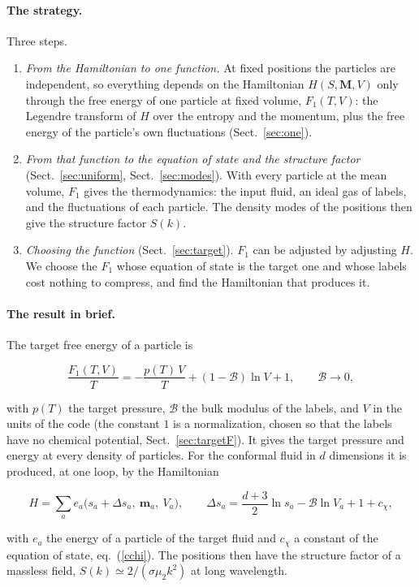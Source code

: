 \documentclass[11pt,aps,preprint,nofootinbib,superscriptaddress,tightenlines]{revtex4-2}
\newcommand{\klab}{\mathcal B}
\def\st{\begin{equation}}
\def\stp{\end{equation}}
\def\Eq#1{eq.~(\ref{#1})}
\def\Sect#1{Sect.~\ref{#1}}
\let\oldparagraph\paragraph
\renewcommand{\paragraph}{\par\bigskip\oldparagraph}
\begin{document}
\paragraph{The strategy.}  Three steps.
\begin{enumerate}
\item \emph{From the Hamiltonian to one function.}  At fixed positions the particles are independent, so everything depends on the Hamiltonian $H(S,\bm M,V)$
  only through the free energy of one particle at fixed volume, $F_1(T,V)$: the Legendre transform of $H$ over the entropy and the momentum, plus the
  free energy of the particle's own fluctuations (\Sect{sec:one}).
\item \emph{From that function to the equation of state and the structure factor} (\Sect{sec:uniform}, \Sect{sec:modes}).  With every particle at the mean volume,
  $F_1$ gives the thermodynamics: the input fluid, an ideal gas of labels, and the fluctuations of each particle.  The density modes of the positions then
  give the structure factor $S(k)$.
\item \emph{Choosing the function} (\Sect{sec:target}).  $F_1$ can be adjusted by adjusting $H$.  We choose the $F_1$ whose equation of state is the target
  one and whose labels cost nothing to compress, and find the Hamiltonian that produces it.
\end{enumerate}

\paragraph{The result in brief.}  The target free energy of a particle is
\begin{keyeq}
\st
\frac{F_1(T,V)}T=-\frac{p(T)\,V}T+(1-\klab)\ln V+1,\qquad \klab\to0 ,
\label{target0}
\stp
\end{keyeq}
with $p(T)$ the target pressure, $\klab$ the bulk modulus of the labels, and $V$ in the units of the code (the constant $1$ is a normalization, chosen so
that the labels have no chemical potential, \Sect{sec:targetF}).  It gives the target pressure and energy at every density of particles.  For the
conformal fluid in $d$ dimensions it is produced, at one loop, by the Hamiltonian
\begin{keyeq}
\st
H=\sum_ae_a\big(s_a+\Delta s_a,\ \bm m_a,\ V_a\big),\qquad \Delta s_a=\frac{d+3}2\ln s_a-\klab\ln V_a+1+c_\chi ,
\label{H0}
\stp
\end{keyeq}
with $e_a$ the energy of a particle of the target fluid and $c_\chi$ a constant of the equation of state, \Eq{cchi}.  The positions then have the structure factor of a massless field, $S(k)\simeq2/(\sigma\mu_2k^2)$
at long wavelength.
\end{document}
